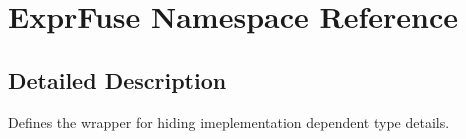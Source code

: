 \hypertarget{namespace_expr_fuse}{}\section{Expr\+Fuse Namespace Reference}
\label{namespace_expr_fuse}


\subsection{Detailed Description}
Defines the wrapper for hiding imeplementation dependent type details. 